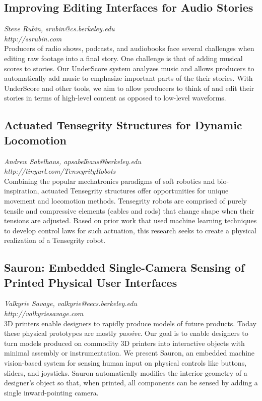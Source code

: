 \documentclass[foldmark,10pt,a4paper,notumble]{leaflet}
\begin{document}
\subsection{Improving Editing Interfaces for Audio Stories}
\emph{Steve Rubin, srubin@cs.berkeley.edu}\\
\emph{http://ssrubin.com}\\
Producers of radio shows, podcasts, and audiobooks face
several challenges when editing raw footage into a final story. One
challenge is that of adding musical scores to stories. Our UnderScore
system analyzes music and allows producers to automatically add music
to emphasize important parts of the their stories. With UnderScore and
other tools, we aim to allow producers to think of and edit their
stories in terms of high-level content as opposed to low-level
waveforms.

\subsection{Actuated Tensegrity Structures for Dynamic Locomotion}
\emph{Andrew Sabelhaus, apsabelhaus@berkeley.edu}\\
\emph{http://tinyurl.com/TensegrityRobots}\\
Combining the popular mechatronics paradigms of soft robotics and bio-inspiration, actuated Tensegrity structures offer opportunities for unique movement and locomotion methods. Tensegrity robots are comprised of purely tensile and compressive elements (cables and rods) that change shape when their tensions are adjusted. Based on prior work that used machine learning techniques to develop control laws for such actuation, this research seeks to create a physical realization of a Tensegrity robot.

\subsection{Sauron: Embedded Single-Camera Sensing of Printed Physical User Interfaces}
\emph{Valkyrie Savage, valkyrie@eecs.berkeley.edu}\\
\emph{http://valkyriesavage.com}\\
3D printers enable designers to rapidly produce models of future products.  Today these physical prototypes are mostly \emph{passive}.  Our goal is to enable designers to turn models produced on commodity 3D printers into interactive objects with minimal assembly or instrumentation.  We present Sauron, an embedded machine vision-based system for sensing human input on physical controls like buttons, sliders, and joysticks.  Sauron automatically modifies the interior geometry of a designer's object so that, when printed, all components can be sensed by adding a single inward-pointing camera.
\end{document}
